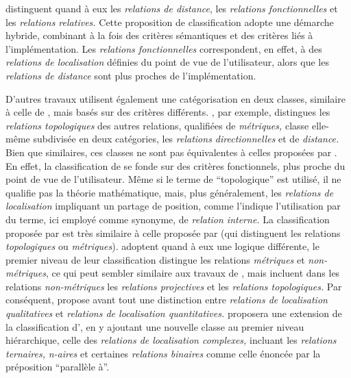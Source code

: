 \textcite{Bateman2010} distinguent quand à eux les \emph{relations de
  distance}, les \emph{relations fonctionnelles} et les
\emph{relations relatives.} Cette proposition de classification adopte
une démarche hybride, combinant à la fois des critères sémantiques et
des critères liés à l'implémentation. Les \emph{relations
  fonctionnelles} correspondent, en effet, à des \emph{relations de
  localisation} définies du point de vue de l'utilisateur, alors que
les \emph{relations de distance} sont plus proches de
l'implémentation.

D'autres travaux \autocite{Hudelot2008a} utilisent également une
catégorisation en deux classes, similaire à celle de
\textcite{Borillo1998}, mais basés sur des critères
différents. \textcite{Hudelot2008a}, par exemple, distingues les
\emph{relations topologiques} des autres relations, qualifiées de
\emph{métriques,} classe elle-même subdivisée en deux catégories, les
\emph{relations directionnelles} et de \emph{distance.} Bien que
similaires, ces classes ne sont pas équivalentes à celles proposées
par \textcite{Borillo1998}. En effet, la classification de
\textcite{Borillo1998} se fonde sur des critères fonctionnels, plus
proche du point de vue de l'utilisateur. Même si le terme de
\enquote{topologique} est utilisé, il ne qualifie pas la théorie
mathématique, mais, plus généralement, les \emph{relations de
  localisation} impliquant un partage de position, comme l'indique
l'utilisation par \textcite{Borillo1998} du terme, ici employé comme
synonyme, de \emph{relation interne.} La classification proposée par
\textcite{Hudelot2008a} est très similaire à celle proposée par
\textcite{Kuipers1988} (qui distinguent les relations
\emph{topologiques} ou \emph{métriques}). \textcite{Louwsma2006}
adoptent quand à eux une logique différente, le premier niveau de leur
classification distingue les relations \emph{métriques} et
\emph{non-métriques}, ce qui peut sembler similaire aux travaux de
\textcite{kuipers1988,Hudelot2008a}, mais \textcite{Louwsma2006}
incluent dans les relations \emph{non-métriques} les \emph{relations
  projectives} et les \emph{relations topologiques.} Par conséquent,
propose avant tout une distinction entre \emph{relations de
  localisation qualitatives} et \emph{relations de localisation
  quantitatives.} \textcite{Bloch2013} proposera une extension de la
classification d'\textcite{Hudelot2008a}, en y ajoutant une nouvelle
classe au premier niveau hiérarchique, celle des \emph{relations de
  localisation complexes,} incluant les \emph{relations ternaires,}
\emph{n-aires} et certaines \emph{relations binaires} comme celle
énoncée par la préposition \enquote{parallèle à}.

